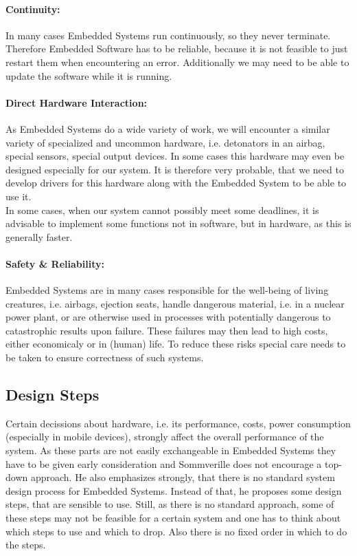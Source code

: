 \documentclass[10pt,a4paper,titlepage,draft]{report} %
\begin{document}
\paragraph{Continuity:}
In many cases Embedded Systems run continuously, so they never terminate.
Therefore Embedded Software has to be reliable, because it is not feasible to just restart them when encountering an error.
Additionally we may need to be able to update the software while it is running.

\paragraph{Direct Hardware Interaction:}
As Embedded Systems do a wide variety of work, we will encounter a similar variety of specialized and uncommon hardware, i.e. detonators in an airbag, special sensors, special output devices.
In some cases this hardware may even be designed especially for our system.
It is therefore very probable, that we need to develop drivers for this hardware along with the Embedded System to be able to use it.\\
In some cases, when our system cannot possibly meet some deadlines, it is advisable to implement some functions not in software, but in hardware, as this is generally faster.

\paragraph{Safety \& Reliability:}
Embedded Systems are in many cases responsible for the well-being of living creatures, i.e. airbags, ejection seats, handle dangerous material, i.e. in a nuclear power plant, or are otherwise used in processes with potentially dangerous to catastrophic results upon failure.
These failures may then lead to high costs, either economicaly or in (human) life.
To reduce these risks special care needs to be taken to ensure correctness of such systems.

\subsection{Design Steps}
Certain decissions about hardware, i.e. its performance, costs, power consumption (especially in mobile devices), strongly affect the overall performance of the system.
As these parts are not easily exchangeable in Embedded Systems they have to be given early consideration and Sommverille does not encourage a top-down approach.
He also emphasizes strongly, that there is no standard system design process for Embedded Systems.
Instead of that, he proposes some design steps, that are sensible to use.
Still, as there is no standard approach, some of these steps may not be feasible for a certain system and one has to think about which steps to use and which to drop.
Also there is no fixed order in which to do the steps.
\end{document}
